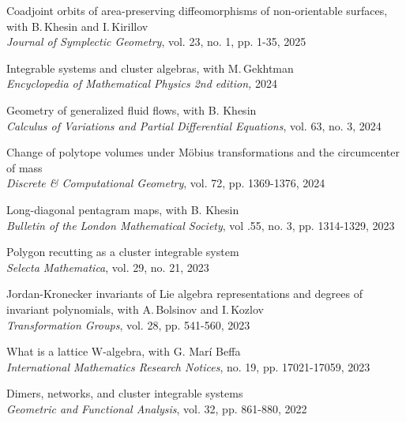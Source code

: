 \documentclass[a4paper, 12pt]{article}
\begin{document}
\begin{compactenum}


\item Coadjoint orbits of area-preserving diffeomorphisms of non-orientable surfaces, with B.\,Khesin and I.\,Kirillov	\\	\textit{Journal of Symplectic Geometry}, vol. 23, no. 1, pp. 1-35, 2025


\item Integrable systems and cluster algebras, with M.\,Gekhtman \\ \textit{Encyclopedia of Mathematical Physics 2nd edition,} 2024

 \item {Geometry of generalized fluid flows}, with B. Khesin \\ \textit{Calculus of Variations and Partial Differential Equations}, vol. 63, no. 3, 2024

 
  \item Change of polytope volumes under M\"obius transformations and the circumcenter of mass\\ \textit{Discrete \& Computational Geometry}, vol. 72, pp. 1369-1376, 2024

 \item {Long-diagonal pentagram maps}, with B. Khesin \\ 	\textit{Bulletin of the London Mathematical Society}, vol .55, no. 3, pp. 1314-1329, 2023


 
  \item {Polygon recutting as a cluster integrable system}\\ \textit{Selecta Mathematica}, vol. 29, no. 21, 2023
 
 \item {Jordan-Kronecker invariants of Lie algebra representations and degrees of invariant polynomials}, with A.\,Bolsinov and I.\,Kozlov\\\textit{Transformation Groups}, vol. 28, pp. 541-560, 2023
 
  \item {What is a lattice W-algebra}, with G. Mar\'i Beffa		\\\textit{International Mathematics Research Notices},  no. 19,  pp. 17021-17059, 2023
 
  \item {Dimers, networks, and cluster integrable systems}\\\textit{Geometric and Functional Analysis}, vol. 32, pp. 861-880, 2022


\end{compactenum}
\end{document}
